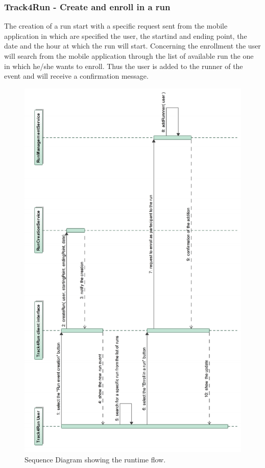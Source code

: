 \documentclass[a4paper]{article}
\begin{document}
\subsubsection{Track4Run - Create and enroll in a run}
The creation of a run start with a specific request sent from the mobile application in which are specified the user, the startind and ending point, the date and the hour at which the run will start.
Concerning the enrollment the user will search from the mobile application through the list of available run the one in which he/she wants to enroll. Thus the user is added to the runner of the event and will receive a confirmation message.

\begin{figure}[H]
    \centering
    \includegraphics[width=\linewidth]{SequenceDiagram-CreateAndEnrollToARunEvent}
    \caption{Sequence Diagram showing the runtime flow.}
    \label{fig:my_label}
\end{figure}
\clearpage
\end{document}
